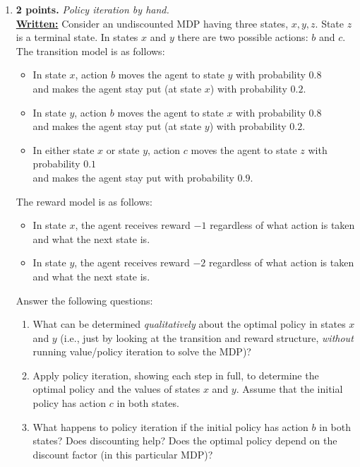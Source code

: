 \documentclass{article}
\begin{document}
\begin{enumerate}
	\item \textbf{2 points.} \textit{Policy iteration by hand.} \\
	      \uline{\textbf{Written:}}
	      Consider an undiscounted MDP having three states, $x, y, z$. %
	      State $z$ is a terminal state. In states $x$ and $y$ there are two possible actions: $b$ and $c$. The transition model is as follows:
	      \begin{itemize}
		      \item In state $x$, action $b$ moves the agent to state $y$ with probability $0.8$ \\
		            and makes the agent stay put (at state $x$) with probability $0.2$.
		      \item In state $y$, action $b$ moves the agent to state $x$ with probability $0.8$ \\
		            and makes the agent stay put (at state $y$) with probability $0.2$.
		      \item In either state $x$ or state $y$, action $c$ moves the agent to state $z$ with probability $0.1$ \\
		            and makes the agent stay put with probability $0.9$.
	      \end{itemize}
	      The reward model is as follows:
	      \begin{itemize}
		      \item In state $x$, the agent receives reward $-1$ regardless of what action is taken and what the next state is.
		      \item In state $y$, the agent receives reward $-2$ regardless of what action is taken and what the next state is.
	      \end{itemize}

	      Answer the following questions:
	      \begin{enumerate}
		      \item What can be determined \textit{qualitatively} about the optimal policy in states $x$ and $y$ (i.e., just by looking at the transition and reward structure, \textit{without} running value/policy iteration to solve the MDP)?

		      \item Apply policy iteration, showing each step in full, to determine the optimal policy and the values of states $x$ and $y$. Assume that the initial policy has action $c$ in both states.

		      \item What happens to policy iteration if the initial policy has action $b$ in both states? Does discounting help? Does the optimal policy depend on the discount factor (in this particular MDP)?


\end{enumerate}
\end{enumerate}
\end{document}
